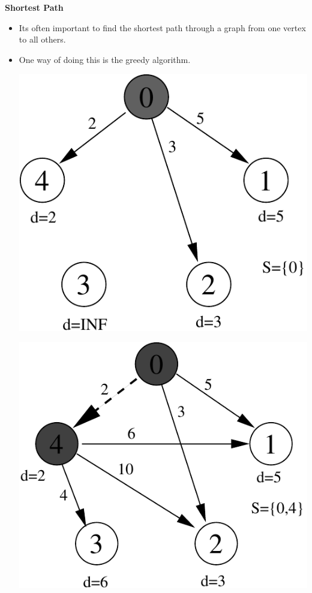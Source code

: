 \documentclass[a4,portraitt]{slides}
\begin{document}
{\newpage
{\samepage
\begin{center}
{\Large{\bf Shortest Path}}
\end{center}
{\small
\begin{itemize}
\item Its often important to find the shortest path through a graph
from one vertex to all others.
\item One way of doing this is the greedy algorithm.
\vspace*{-1ex}
\begin{center}
\includegraphics{../Images/graphb.pdf}
\end{center}
\vspace*{-1ex}
\begin{center}
\includegraphics{../Images/graphc.pdf}
\end{center}
\end{itemize}
}}

}
\end{document}
